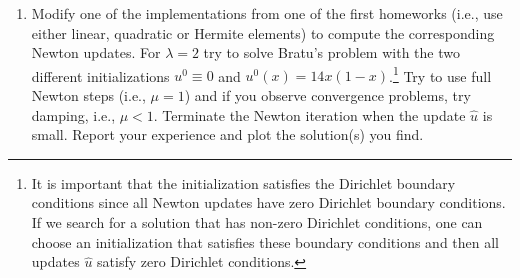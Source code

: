\documentclass[11pt]{article}
\begin{document}
\begin{enumerate}
\begin{enumerate}
{\bf Solution}\\
To find the weak form of the Bratu problem we multiply by a test function $v\in V$ and integrate.
\[
\int_0^1 u''v + \lambda e^u v\ dx = \int_0^1 -u'v' + \lambda e^u v\ dx = 0 
\]
Therefore, we define
\[
G(u,v) := \int_0^1 -u'v' + \lambda e^u v\ dx
\]
for all $u,v \in V$.  Now we compute the directional derivative in a direction $\hat{u} \in V$ by
\begin{align*}
\delta_u G(u,v)(\hat{u}) &= \lim_{\varepsilon \to 0} \frac{1}{\varepsilon} \left\{ \int_0^1 -(u + \varepsilon \hat{u})'v' + \lambda e^{u + \varepsilon \hat{u}}v\ dx  -   \int_0^1 -u'v' + \lambda e^{u}v\ dx \right\}\\
&= \lim_{\varepsilon \to 0} \frac{1}{\varepsilon} \left\{  \int_0^1 -\varepsilon \hat{u}'v' + \lambda e^{u}v \left( e^{\varepsilon \hat{u}} - 1 \right)   \right\}\\
&= \int_0^1 -\hat{u}'v' + \lambda e^u v \hat{u}\ dx
\end{align*}
where the last line follows from the dominated convergence theorem and the fact that 
\[
\lim_{\varepsilon \to 0} \frac{1}{\varepsilon}\left( e^{\varepsilon \hat{u}} - 1 \right) = \hat{u}
\]
for all $x\in (0,1)$.  Thus, the weak form of the Newton update is: given $u^{k} \in V$, find $\hat{u} \in V$ such that 
\[
\int_0^1 -\hat{u}'v' + \lambda e^{u^k} v \hat{u}\ dx = - \int_0^1 -(u^k)'v' + \lambda e^{u^k} v\ dx
\]
for all $v\in V$.  This is now a linear equation for $\hat{u}$ and the right hand side does not depend on $\hat{u}$.\\



\item Modify one of the implementations from one of the first
  homeworks (i.e., use either linear, quadratic or Hermite elements)
  to compute the corresponding Newton updates. For $\lambda=2$ try to
  solve Bratu's problem with the two different initializations
  $u^0\equiv 0$ and $u^0(x) = 14x(1-x)$.\footnote{It is important that
    the initialization satisfies the Dirichlet boundary conditions
    since all Newton updates have zero Dirichlet boundary
    conditions. If we search for a solution that has non-zero
    Dirichlet conditions, one can choose an initialization that
    satisfies these boundary conditions and then all updates $\hat u$
    satisfy zero Dirichlet conditions.} Try to use full Newton steps
  (i.e., $\mu=1$) and if you observe convergence problems, try
  damping, i.e., $\mu<1$. Terminate the Newton iteration when the
  update $\hat u$ is small. Report your experience and plot the
  solution(s) you find.
  

\end{enumerate}
\end{enumerate}
\end{document}

